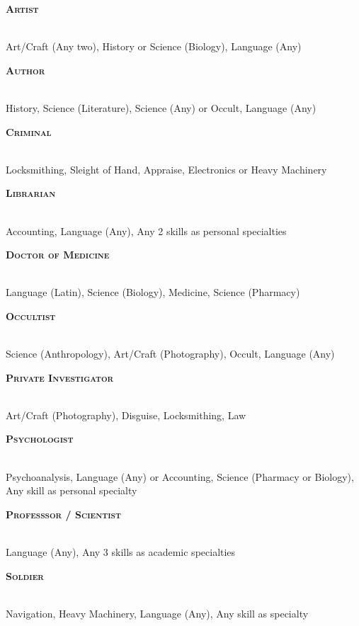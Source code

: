 

\newcommand{\makebackground}[3]{
    \noindent
    \begin{minipage}{\linewidth}
        {\raggedright\normalfont\large\bfseries\scshape #1}\\
        #3
    \end{minipage}
    \par
}
\vspace{\parskip}
\begin{multicols}{2}
    \makebackground{Artist}{}
    {Art/Craft (Any two), History or Science (Biology), Language (Any)}

    \makebackground{Author}{}
    {History, Science (Literature), Science (Any) or Occult, Language (Any)}

    \makebackground{Criminal}{}
    {Locksmithing, Sleight of Hand, Appraise, Electronics or Heavy Machinery}
    
    \makebackground{Librarian}{}
    {Accounting, Language (Any), Any 2 skills as personal specialties}
    
    \makebackground{Doctor of Medicine}{}
    {Language (Latin), Science (Biology), Medicine, Science (Pharmacy)}

    \makebackground{Occultist}{}
    {Science (Anthropology), Art/Craft (Photography), Occult, Language (Any)}
   
    \makebackground{Private Investigator}{}
    {Art/Craft (Photography), Disguise, Locksmithing, Law}

    \makebackground{Psychologist}{}
    {Psychoanalysis, Language (Any) or Accounting, Science (Pharmacy or Biology), Any skill as personal specialty}

    \makebackground{Professsor / Scientist}{}
    {Language (Any), Any 3 skills as academic specialties}

    \makebackground{Soldier}{}
    {Navigation, Heavy Machinery, Language (Any), Any skill as specialty}

\end{multicols}

